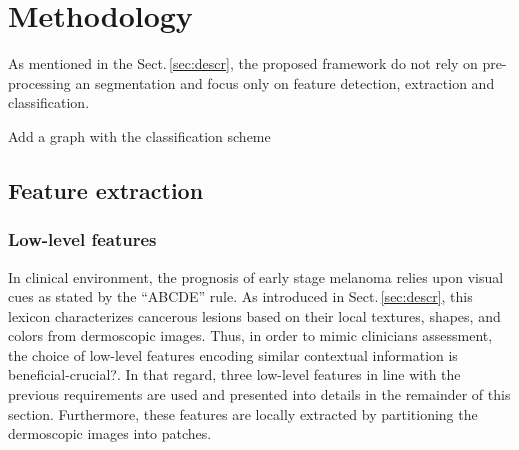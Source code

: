 \section{Methodology}
\label{sec:method}
\graphicspath{ {./content/method/figures/} }
As mentioned in the Sect.\,\ref{sec:descr}, the proposed framework do not rely on pre-processing an segmentation and focus only on feature detection, extraction and classification.

{\color{red} Add a graph with the classification scheme}

\subsection{Feature extraction}

\subsubsection{Low-level features}

In clinical environment, the prognosis of early stage melanoma relies upon visual cues as stated by the ``ABCDE'' rule.
As introduced in Sect.\,\ref{sec:descr}, this lexicon characterizes cancerous lesions based on their local textures, shapes, and colors from dermoscopic images.
Thus, in order to mimic clinicians assessment, the choice of low-level features encoding similar contextual information is beneficial{\color{red}-crucial?}.
In that regard, three low-level features in line with the previous requirements are used and presented into details in the remainder of this section.
Furthermore, these features are locally extracted by partitioning the dermoscopic images into patches.


